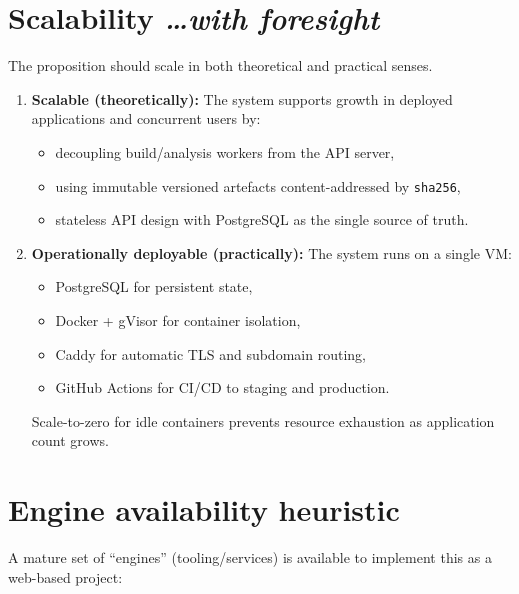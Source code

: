 \documentclass[11pt,a4paper]{article}
\newcommand{\BvrHint}[1]{%
{\normalfont\normalsize\itshape\hfill #1}}
\begin{document}
\section{Scalability %
\BvrHint{\ldots with foresight}}

The proposition should scale in both theoretical and practical senses.

\begin{enumerate}[leftmargin=0.7cm]
  \item \textbf{Scalable (theoretically):} The system supports growth in deployed
    applications and concurrent users by:
    \begin{itemize}[leftmargin=0.7cm]
      \item decoupling build/analysis workers from the API server,
      \item using immutable versioned artefacts content-addressed by \texttt{sha256},
      \item stateless API design with PostgreSQL as the single source of truth.
    \end{itemize}

  \item \textbf{Operationally deployable (practically):} The system runs on a single
    VM:
    \begin{itemize}[leftmargin=0.7cm]
      \item PostgreSQL for persistent state,
      \item Docker + gVisor for container isolation,
      \item Caddy for automatic TLS and subdomain routing,
      \item GitHub Actions for CI/CD to staging and production.
    \end{itemize}
    Scale-to-zero for idle containers prevents resource exhaustion as application
    count grows.
\end{enumerate}

\section{Engine availability heuristic}

A mature set of ``engines'' (tooling/services) is available to implement this as a
web-based project:
\end{document}
